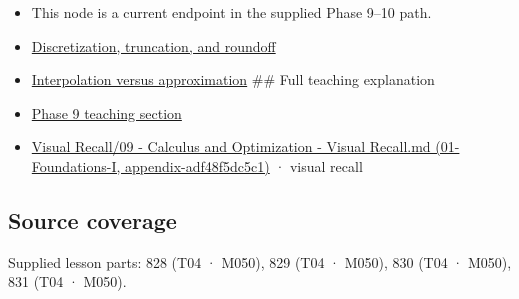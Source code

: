 \begin{itemize}
\item
  This node is a current endpoint in the supplied Phase 9--10 path.
\item
  \hyperref[appendix-6b0648b2b8e8]{Discretization, truncation, and roundoff}
\item
  \hyperref[appendix-0c2a5f69851e]{Interpolation versus approximation} \#\# Full teaching explanation
\item
  \href{Continuous\%20Notes/Computing\%20Foundations\%20-\%20From\%20Bits\%20to\%20C++\%20and\%20Systems\%20APIs\#Jacobians,\%20curvature,\%20and\%20local\%20approximation}{Phase 9 teaching section}
\item
  \href{}{Visual Recall/09 - Calculus and Optimization - Visual Recall.md (01-Foundations-I, appendix-adf48f5dc5c1)} · visual recall
\end{itemize}

\subsection{Source coverage}\label{source-coverage}

Supplied lesson parts: 828 (T04 · M050), 829 (T04 · M050), 830 (T04 · M050), 831 (T04 · M050).
